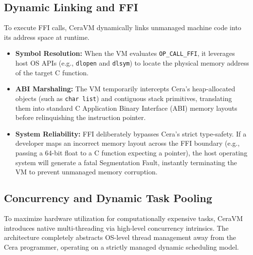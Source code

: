\documentclass[11pt, a4paper]{article}
\begin{document}
\subsection{Dynamic Linking and FFI}
\noindent
To execute FFI calls, CeraVM dynamically links unmanaged machine code into its address space at runtime.

\begin{itemize}
    \item \textbf{Symbol Resolution:} When the VM evaluates \texttt{OP\_CALL\_FFI}, it leverages host OS APIs (e.g., \texttt{dlopen} and \texttt{dlsym}) to locate the physical memory address of the target C function.
    \item \textbf{ABI Marshaling:} The VM temporarily intercepts Cera's heap-allocated objects (such as \texttt{char list}) and contiguous stack primitives, translating them into standard C Application Binary Interface (ABI) memory layouts before relinquishing the instruction pointer.
    \item \textbf{System Reliability:} FFI deliberately bypasses Cera's strict type-safety. If a developer maps an incorrect memory layout across the FFI boundary (e.g., passing a 64-bit float to a C function expecting a pointer), the host operating system will generate a fatal Segmentation Fault, instantly terminating the VM to prevent unmanaged memory corruption.
\end{itemize}

\subsection{Concurrency and Dynamic Task Pooling}
\noindent
To maximize hardware utilization for computationally expensive tasks, CeraVM introduces native multi-threading via high-level concurrency intrinsics. The architecture completely abstracts OS-level thread management away from the Cera programmer, operating on a strictly managed dynamic scheduling model.
\end{document}
